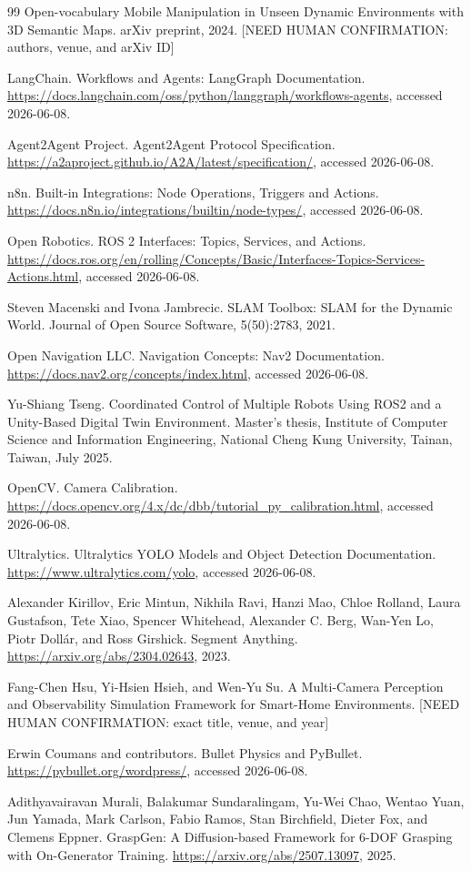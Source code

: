 \documentclass[12pt,a4paper]{article}
\begin{document}
\begin{thebibliography}{99}
Open-vocabulary Mobile Manipulation in Unseen Dynamic Environments with 3D Semantic Maps.
arXiv preprint, 2024. [NEED HUMAN CONFIRMATION: authors, venue, and arXiv ID]

LangChain.
Workflows and Agents: LangGraph Documentation.
\url{https://docs.langchain.com/oss/python/langgraph/workflows-agents}, accessed 2026-06-08.

Agent2Agent Project.
Agent2Agent Protocol Specification.
\url{https://a2aproject.github.io/A2A/latest/specification/}, accessed 2026-06-08.

n8n.
Built-in Integrations: Node Operations, Triggers and Actions.
\url{https://docs.n8n.io/integrations/builtin/node-types/}, accessed 2026-06-08.

Open Robotics.
ROS 2 Interfaces: Topics, Services, and Actions.
\url{https://docs.ros.org/en/rolling/Concepts/Basic/Interfaces-Topics-Services-Actions.html}, accessed 2026-06-08.

Steven Macenski and Ivona Jambrecic.
SLAM Toolbox: SLAM for the Dynamic World.
Journal of Open Source Software, 5(50):2783, 2021.

Open Navigation LLC.
Navigation Concepts: Nav2 Documentation.
\url{https://docs.nav2.org/concepts/index.html}, accessed 2026-06-08.

Yu-Shiang Tseng.
Coordinated Control of Multiple Robots Using ROS2 and a Unity-Based Digital Twin Environment.
Master's thesis, Institute of Computer Science and Information Engineering, National Cheng Kung University, Tainan, Taiwan, July 2025.

OpenCV.
Camera Calibration.
\url{https://docs.opencv.org/4.x/dc/dbb/tutorial_py_calibration.html}, accessed 2026-06-08.

Ultralytics.
Ultralytics YOLO Models and Object Detection Documentation.
\url{https://www.ultralytics.com/yolo}, accessed 2026-06-08.

Alexander Kirillov, Eric Mintun, Nikhila Ravi, Hanzi Mao, Chloe Rolland, Laura Gustafson, Tete Xiao, Spencer Whitehead, Alexander C. Berg, Wan-Yen Lo, Piotr Doll\'ar, and Ross Girshick.
Segment Anything.
\url{https://arxiv.org/abs/2304.02643}, 2023.

Fang-Chen Hsu, Yi-Hsien Hsieh, and Wen-Yu Su.
A Multi-Camera Perception and Observability Simulation Framework for Smart-Home Environments.
[NEED HUMAN CONFIRMATION: exact title, venue, and year]

Erwin Coumans and contributors.
Bullet Physics and PyBullet.
\url{https://pybullet.org/wordpress/}, accessed 2026-06-08.

Adithyavairavan Murali, Balakumar Sundaralingam, Yu-Wei Chao, Wentao Yuan, Jun Yamada, Mark Carlson, Fabio Ramos, Stan Birchfield, Dieter Fox, and Clemens Eppner.
GraspGen: A Diffusion-based Framework for 6-DOF Grasping with On-Generator Training.
\url{https://arxiv.org/abs/2507.13097}, 2025.

\end{thebibliography}
\end{document}
